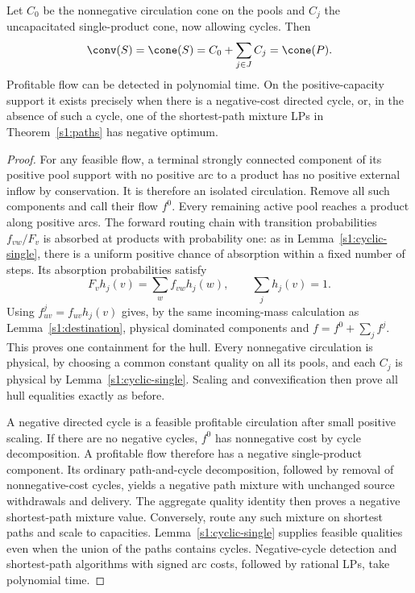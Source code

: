 \begin{theorem}\label{s1:cyclic-sign}
Let $C_0$ be the nonnegative circulation cone on the pools and $C_j$
the uncapacitated single-product cone, now allowing cycles. Then
\[
 \conv(S)=\cone(S)=C_0+\sum_{j\in J}C_j=\cone(P).
\]
Profitable flow can be detected in polynomial time. On the
positive-capacity support it exists precisely when there is a
negative-cost directed cycle, or, in the absence of such a cycle,
one of the shortest-path mixture LPs in Theorem~\ref{s1:paths} has
negative optimum.
\end{theorem}
\begin{proof}
For any feasible flow, a terminal strongly connected component of its
positive pool support with no positive arc to a product has no positive
external inflow by conservation. It is therefore an isolated circulation.
Remove all such components and call their flow $f^0$. Every remaining
active pool reaches a product along positive arcs. The forward routing
chain with transition probabilities $f_{vw}/F_v$ is absorbed at products
with probability one: as in Lemma~\ref{s1:cyclic-single}, there is a
uniform positive chance of absorption within a fixed number of steps.
Its absorption probabilities satisfy
\[
 F_vh_j(v)=\sum_wf_{vw}h_j(w),\qquad\sum_jh_j(v)=1.
\]
Using $f^j_{uv}=f_{uv}h_j(v)$ gives, by the same incoming-mass
calculation as Lemma~\ref{s1:destination}, physical dominated components
and $f=f^0+\sum_jf^j$. This proves one containment for the hull.
Every nonnegative circulation is physical, by choosing a common constant
quality on all its pools, and each $C_j$ is physical by
Lemma~\ref{s1:cyclic-single}. Scaling and convexification then prove all
hull equalities exactly as before.

A negative directed cycle is a feasible profitable circulation after
small positive scaling. If there are no negative cycles, $f^0$ has
nonnegative cost by cycle decomposition. A profitable flow therefore
has a negative single-product component. Its ordinary path-and-cycle
decomposition, followed by removal of nonnegative-cost cycles, yields
a negative path mixture with unchanged source withdrawals and delivery.
The aggregate quality identity then proves a negative shortest-path
mixture value. Conversely, route any such mixture on shortest paths
and scale to capacities. Lemma~\ref{s1:cyclic-single} supplies feasible
qualities even when the union of the paths contains cycles. Negative-cycle
detection and shortest-path algorithms with signed arc costs, followed
by rational LPs, take polynomial time.
\end{proof}

